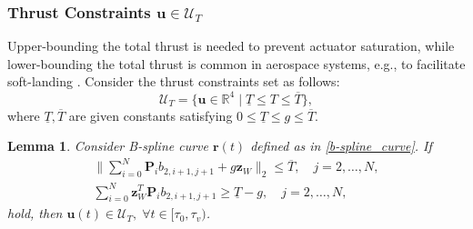 \documentclass[journal,10pt]{IEEEtran}
\newtheorem{lemma}{\bfseries Lemma}%
\newcommand{\vect}[1]{\boldsymbol{\mathbf{#1}}}
\newcommand{\mat}[1]{\begin{bmatrix} #1 \end{bmatrix}}
\newif\ifdraft
\newcommand{\VF}[1]{\ifdraft{\color{blue}[{\bf VF}: #1]}\fi}
\begin{document}


\subsubsection{Thrust Constraints $\vect{u}\in\mathcal{U}_{T}$} 
Upper-bounding the total thrust is needed to prevent actuator saturation, while lower-bounding the total thrust is common in aerospace systems, e.g., to facilitate  soft-landing  \cite{accikmecse2011lossless}. Consider the thrust constraints  set as follows:
\begin{equation}\label{const_T}
    \mathcal{U}_T = \{\vect{u}\in\mathbb{R}^4\mid\underline{T}\leq T \leq \overline{T}\},
\end{equation}
where $\underline{T},\overline{T}$ are given constants satisfying $0\leq \underline{T}\leq g\leq \overline{T}$.
\begin{lemma}\label{lemthrust} 
Consider B-spline curve $\vect{r}(t)$ defined as in \eqref{b-spline_curve}. If
\begin{subequations}\label{cp_thrust}
\begin{align}
    \bigg\|\sum_{i=0}^N\vect{P}_ib_{2,i+1,j+1} + g\vect{z}_W\bigg\|_2\leq \overline{T}, \quad j=2,\ldots,N, \label{cp_Tmax}\\
    \sum_{i=0}^N\vect{z}_W^T\vect{P}_ib_{2,i+1,j+1}\geq \underline{T}-g, \quad j= 2,\ldots,N, \label{cp_Tmin}
\end{align}
\end{subequations}
hold, then $\vect{u}(t) \in \mathcal{U}_T, \; \forall t\in[\tau_0,\tau_v)$.
\end{lemma}
\end{document}
